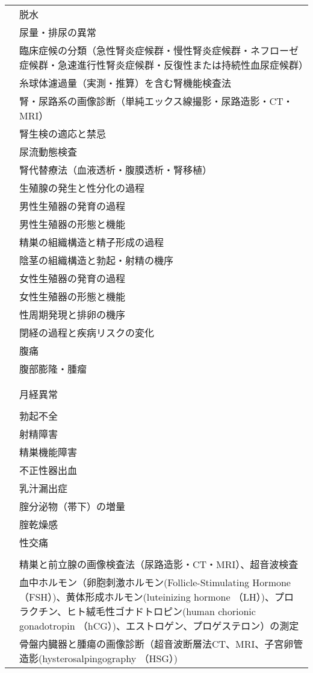 \begin{xltabular}{\linewidth}{XX}
 & 脱水 \\
 & 尿量・排尿の異常 \\
 & 臨床症候の分類（急性腎炎症候群・慢性腎炎症候群・ネフローゼ症候群・急速進行性腎炎症候群・反復性または持続性血尿症候群） \\
 & 糸球体濾過量（実測・推算）を含む腎機能検査法 \\
 & 腎・尿路系の画像診断（単純エックス線撮影・尿路造影・CT・MRI） \\
 & 腎生検の適応と禁忌 \\
 & 尿流動態検査 \\
 & 腎代替療法（血液透析・腹膜透析・腎移植） \\
 & 生殖腺の発生と性分化の過程 \\
 & 男性生殖器の発育の過程 \\
 & 男性生殖器の形態と機能 \\
 & 精巣の組織構造と精子形成の過程 \\
 & 陰茎の組織構造と勃起・射精の機序 \\
 & 女性生殖器の発育の過程 \\
 & 女性生殖器の形態と機能 \\
 & 性周期発現と排卵の機序 \\
 & 閉経の過程と疾病リスクの変化 \\
 & 腹痛 \\
 & 腹部膨隆・腫瘤 \\
 &  \\
 &  \\
 & 月経異常 \\
 &  \\
 & 勃起不全 \\
 & 射精障害 \\
 & 精巣機能障害 \\
 & 不正性器出血 \\
 & 乳汁漏出症 \\
 & 腟分泌物（帯下）の増量 \\
 & 腟乾燥感 \\
 & 性交痛 \\
 &  \\
 & 精巣と前立腺の画像検査法（尿路造影・CT・MRI）、超音波検査 \\
 & 血中ホルモン（卵胞刺激ホルモン(Follicle-Stimulating Hormone （FSH）)、黄体形成ホルモン(luteinizing hormone （LH）)、プロラクチン、ヒト絨毛性ゴナドトロピン(human chorionic gonadotropin （hCG）)、エストロゲン、プロゲステロン）の測定 \\
 & 骨盤内臓器と腫瘍の画像診断（超音波断層法CT、MRI、子宮卵管造影(hysterosalpingography （HSG）) \\

\end{xltabular}

